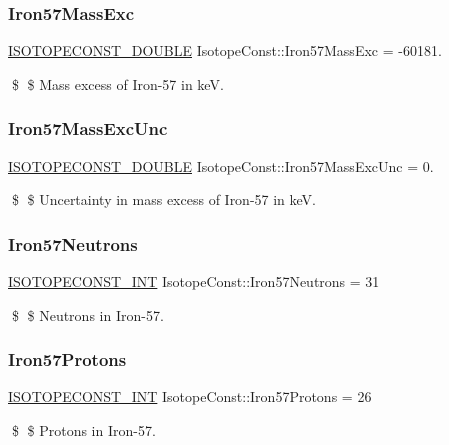 \subsubsection{\texorpdfstring{Iron57\+Mass\+Exc}{Iron57MassExc}}
{\footnotesize\ttfamily \mbox{\hyperlink{group___isotope_const-_macros_ga8f45a7272ce02c0b4c65c44636ed719a}{I\+S\+O\+T\+O\+P\+E\+C\+O\+N\+S\+T\+\_\+\+D\+O\+U\+B\+LE}} Isotope\+Const\+::\+Iron57\+Mass\+Exc = -\/60181.}

\$ \$ Mass excess of Iron-\/57 in keV. \mbox{\label{group___isotope_const-_iron-_fe57_gacfd29e3adc3e9c692942710fa76d6122}} 
\subsubsection{\texorpdfstring{Iron57\+Mass\+Exc\+Unc}{Iron57MassExcUnc}}
{\footnotesize\ttfamily \mbox{\hyperlink{group___isotope_const-_macros_ga8f45a7272ce02c0b4c65c44636ed719a}{I\+S\+O\+T\+O\+P\+E\+C\+O\+N\+S\+T\+\_\+\+D\+O\+U\+B\+LE}} Isotope\+Const\+::\+Iron57\+Mass\+Exc\+Unc = 0.}

\$ \$ Uncertainty in mass excess of Iron-\/57 in keV. \mbox{\label{group___isotope_const-_iron-_fe57_gaa043153f1bd948ea5c27cd802b05af1a}} 
\subsubsection{\texorpdfstring{Iron57\+Neutrons}{Iron57Neutrons}}
{\footnotesize\ttfamily \mbox{\hyperlink{group___isotope_const-_macros_ga5f18360b3e99483a35c32d789e62621c}{I\+S\+O\+T\+O\+P\+E\+C\+O\+N\+S\+T\+\_\+\+I\+NT}} Isotope\+Const\+::\+Iron57\+Neutrons = 31}

\$ \$ Neutrons in Iron-\/57. \mbox{\label{group___isotope_const-_iron-_fe57_gacc4e1cf6909a3c765c10030f5c8dc329}} 
\subsubsection{\texorpdfstring{Iron57\+Protons}{Iron57Protons}}
{\footnotesize\ttfamily \mbox{\hyperlink{group___isotope_const-_macros_ga5f18360b3e99483a35c32d789e62621c}{I\+S\+O\+T\+O\+P\+E\+C\+O\+N\+S\+T\+\_\+\+I\+NT}} Isotope\+Const\+::\+Iron57\+Protons = 26}

\$ \$ Protons in Iron-\/57. 